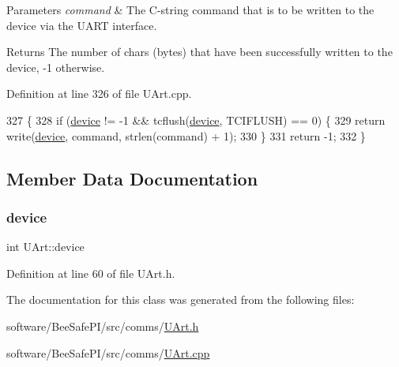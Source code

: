 \begin{DoxyParams}{Parameters}
{\em command} & The C-\/string command that is to be written to the device via the U\+A\+RT interface. \\
\hline
\end{DoxyParams}
\begin{DoxyReturn}{Returns}
The number of chars (bytes) that have been successfully written to the device, -\/1 otherwise. 
\end{DoxyReturn}


Definition at line 326 of file U\+Art.\+cpp.


\begin{DoxyCode}
327 \{
328     \textcolor{keywordflow}{if} (\hyperlink{class_u_art_a61fb55cc7c92c85f2219dffcfb58bc12}{device} != -1 && tcflush(\hyperlink{class_u_art_a61fb55cc7c92c85f2219dffcfb58bc12}{device}, TCIFLUSH) == 0) \{
329         \textcolor{keywordflow}{return} write(\hyperlink{class_u_art_a61fb55cc7c92c85f2219dffcfb58bc12}{device}, command, strlen(command) + 1);
330     \}
331     \textcolor{keywordflow}{return} -1;
332 \}
\end{DoxyCode}


\subsection{Member Data Documentation}
\mbox{\label{class_u_art_a61fb55cc7c92c85f2219dffcfb58bc12}} 
\subsubsection{\texorpdfstring{device}{device}}
{\footnotesize\ttfamily int U\+Art\+::device\hspace{0.3cm}{\ttfamily [private]}}



Definition at line 60 of file U\+Art.\+h.



The documentation for this class was generated from the following files\+:\begin{DoxyCompactItemize}
\item 
software/\+Bee\+Safe\+P\+I/src/comms/\hyperlink{_u_art_8h}{U\+Art.\+h}\item 
software/\+Bee\+Safe\+P\+I/src/comms/\hyperlink{_u_art_8cpp}{U\+Art.\+cpp}\end{DoxyCompactItemize}
